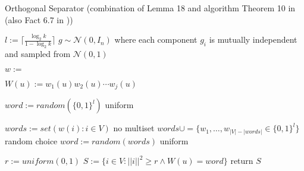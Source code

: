 \begin{algorithm}[h!]
	\caption{Orthogonal Separator (combination of Lemma 18 and algorithm Theorem 10 in \cite{LouisM14} (also Fact 6.7 in \cite{ChanLTZ16})) \label{alg:orthogonal_separator}} 
\begin{algorithmic}
	\State $l := \lceil \frac{\log_2 k}{1-\log_2 k}\rceil$
	\State $g \sim \mathcal{N} (0,I_n)$ where each component $g_i$ is mutually independent and sampled from $\mathcal{N} (0,1)$
	

	
	\State $w := $
	
	\State $W(u) := w_1(u)w_2(u)\cdots w_j(u)$
	\EndFor
	
	\State $word := random( \{0,1\}^l)$ uniform
	
	\Else
	 
	\State $words := set({w(i): i\in V})$  no multiset
	\State $words \cup= \{w_1, \ldots , w_{|V|-|words|} \in \{0,1\}^l\} $ random choice
	\State $word := random(words)$ uniform
	
	\EndIf
	
	\State $r := uniform(0,1)$
	\State $S := \{i \in V: ||i||^2 \ge r \land W(u) = word \}$
	\State return $S$
	
	\EndFunction %
\end{algorithmic}
\end{algorithm}	

	
	
